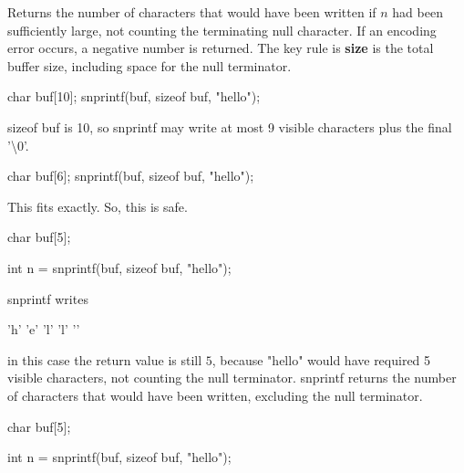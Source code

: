 \documentclass{report}
\begin{document}
\begin{itemize}
            \bigbreak \noindent 
            Returns the number of characters that would have been written if $n$ had been sufficiently large, not counting the terminating null character. If an encoding error occurs, a negative number is returned.
            \bigbreak \noindent 
            The key rule is \textbf{size} is the total buffer size, including space for the null terminator.
            \bigbreak \noindent 
            \begin{cppcode}
                char buf[10];
                snprintf(buf, sizeof buf, "hello");
            \end{cppcode}
            \bigbreak \noindent 
            sizeof buf is 10, so snprintf may write at most 9 visible characters plus the final '\textbackslash0'.
            \bigbreak \noindent 
            \begin{cppcode}
                char buf[6];
                snprintf(buf, sizeof buf, "hello");
            \end{cppcode}
            \bigbreak \noindent 
            This fits exactly. So, this is safe. 
            \bigbreak \noindent 
            \begin{cppcode}
                char buf[5];

                int n = snprintf(buf, sizeof buf, "hello");
            \end{cppcode}
            \bigbreak \noindent 
            snprintf writes
            \bigbreak \noindent 
            \begin{cppcode}
            'h' 'e' 'l' 'l' '\0'
            \end{cppcode}
            \bigbreak \noindent 
            in this case the return value is still $5$, because "hello" would have required 5 visible characters, not counting the null terminator. snprintf returns the number of characters that would have been written, excluding the null terminator.
            \bigbreak \noindent 
            \begin{cppcode}
                char buf[5];

                int n = snprintf(buf, sizeof buf, "hello");


\end{cppcode}
\end{itemize}
\end{document}
